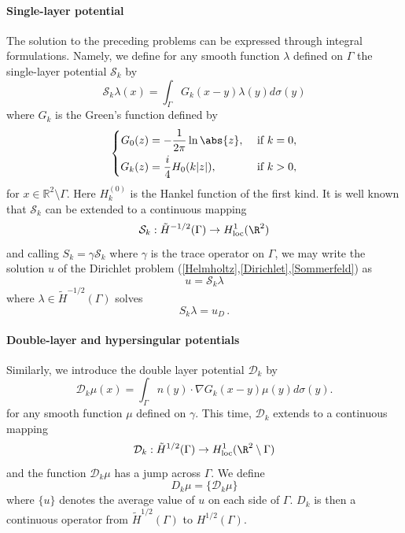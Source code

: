 \documentclass[a4paper]{article}
\begin{document}
	\paragraph{Single-layer potential}  
	The solution to the preceding problems can be expressed through integral formulations. Namely, we define for any smooth function $\lambda$ defined on $\Gamma$ the single-layer potential $\mathcal{S}_k$  by 
	\begin{equation}
	\mathcal{S}_k\lambda(x) = \int_{\Gamma}G_k(x-y)\lambda(y)d\sigma(y)
	\label{defSk}
	\end{equation}
	where $G_k$ is the Green's function defined by 
	\begin{equation}
	\left\{
	\begin{aligned}
	G_0(z) &= -\dfrac{1}{2\pi} \ln \abs{z}, && \text{ if } k= 0,\\
	G_k(z) &= \frac{i}{4}H_0(k|z|), && \text{ if } k > 0,
	\end{aligned} \right.
	\end{equation} 
	for $x\in \mathbb{R}^2\setminus \Gamma$. Here $H^{(0)}_k$ is the Hankel function of the first kind. It is well known that $\mathcal{S}_k$ can be extended to a continuous mapping 
	\[\mathcal{S}_k : \tilde{H}^{-1/2}(\Gamma) \to H^1_{\text{loc}}(\R^2)\] 
	and calling $S_k = \gamma \mathcal{S}_k$ where $\gamma$ is the trace operator on $\Gamma$, we may write the solution
	$u$ of the Dirichlet problem (\ref{Helmholtz},\ref{Dirichlet},\ref{Sommerfeld}) as
	\begin{equation}
	u = \mathcal{S}_k \lambda
	\end{equation}
	where $\lambda \in \tilde{H}^{-1/2}(\Gamma)$ solves
	\begin{equation}
	S_k \lambda = u_D\,.
	\label{Sklambda}
	\end{equation}
	
	\paragraph{Double-layer and hypersingular potentials}
	Similarly, we introduce the double layer potential $\mathcal{D}_k$ by 
	\[\mathcal{D}_k \mu(x) = \int_{\Gamma} n(y) \cdot \nabla G_k(x-y) \mu(y) d\sigma(y).\]
	for any smooth function $\mu$ defined on $\gamma$. This time, $\mathcal{D}_k$ extends to a continuous mapping 
	\[\mathcal{D}_k : \tilde{H}^{1/2}(\Gamma) \to H^{1}_{\text{loc}}(\R^2 \setminus \Gamma)\]
	and the function $\mathcal{D}_k \mu$ has a jump across $\Gamma$. We define 
	\[D_k \mu  = \lbrace\mathcal{D}_k \mu \rbrace\]
	where $\lbrace u \rbrace$ denotes the average value of $u$ on each side of $\Gamma$. $D_k$ is then a continuous operator from $\tilde{H}^{1/2}(\Gamma)$ to $H^{1/2}(\Gamma)$. 
	
\end{document}

